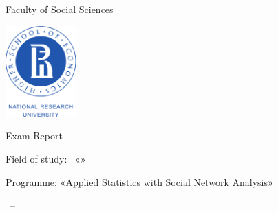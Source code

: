 \begin{titlingpage}

\begin{center}
  \thesisOrganization
  
  \vspace{0pt plus1fill}  
  Faculty of Social Sciences
\end{center}

\vspace{0pt plus1fill} %
\begin{center}
  \includegraphics[height=3.5cm]{common/image/logo-hse.pdf}
\end{center}

\vspace{0pt plus7fill} %
\begin{center}

  {\large \thesisAuthorFL}
  
  \vspace{0pt plus1fill}
  \textbf {\large \thesisTitle}
  
  \vspace{0pt plus1fill}  
  Exam Report
  
\end{center}

\vspace{0pt plus1fill}    
\begin{center}
    
  Field of study: \thesisSpecialtyNumber~«\thesisSpecialtyTitle»
  
  \vspace{0pt plus1fill}
  Programme: «Applied Statistics with Social Network Analysis»
  
\end{center}

\vspace{0pt plus32fill}
{\centering\thesisCity\ -- \thesisYear\par}

\end{titlingpage}